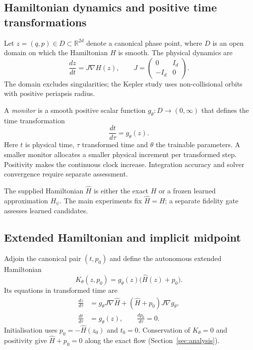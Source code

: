 \documentclass[final,3p,times]{elsarticle}
\begin{document}
\subsection{Hamiltonian dynamics and positive time transformations}
\label{sec:time-transformation}
Let $z=(q,p)\in D\subset\mathbb{R}^{2d}$ denote a canonical phase point,
where $D$ is an open domain on which the Hamiltonian $H$ is smooth. The
physical dynamics are
\begin{equation}
 \frac{dz}{dt}=J\nabla H(z),\qquad
 J=\begin{pmatrix}0&I_d\\-I_d&0\end{pmatrix}.
 \label{eq:physical-dynamics}
\end{equation}
The domain excludes singularities; the Kepler study uses non-collisional
orbits with positive periapsis radius.

A \emph{monitor} is a smooth positive scalar function $g_\theta:D\to(0,\infty)$
that defines the time transformation
\begin{equation}
 \frac{dt}{d\tau}=g_\theta(z).
 \label{eq:time-transformation}
\end{equation}
Here $t$ is physical time, $\tau$ transformed time and $\theta$ the trainable
parameters. A smaller monitor allocates a smaller physical increment per
transformed step. Positivity makes the continuous clock increase.
Integration accuracy and solver convergence require separate assessment.

The supplied Hamiltonian $\widehat H$ is either the exact $H$ or a frozen
learned approximation $H_\psi$. The main experiments fix $\widehat H=H$;
a separate fidelity gate assesses learned candidates.

\subsection{Extended Hamiltonian and implicit midpoint}
\label{sec:midpoint-construction}
Adjoin the canonical pair $(t,p_0)$ and define the autonomous extended
Hamiltonian~\cite{Duruisseaux2021}
\begin{equation}
 K_\theta(z,p_0)=g_\theta(z)\bigl(\widehat H(z)+p_0\bigr).
 \label{eq:extended-hamiltonian}
\end{equation}
Its equations in transformed time are
\begin{align}
 \frac{dz}{d\tau}
 &=g_\theta J\nabla\widehat H
   +(\widehat H+p_0)J\nabla g_\theta,
 \label{eq:extended-state}\\
 \frac{dt}{d\tau}&=g_\theta(z),\qquad
 \frac{dp_0}{d\tau}=0.
 \label{eq:extended-clock}
\end{align}
Initialisation uses $p_0=-\widehat H(z_0)$ and $t_0=0$. Conservation of
$K_\theta=0$ and positivity give $\widehat H+p_0=0$ along the exact flow
(Section~\ref{sec:analysis}).
\end{document}
